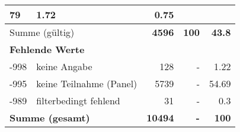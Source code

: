 \begin{longtable}{lXrrr}
       \num{79} &
       \num[round-mode=places,round-precision=2]{1,72} &
         \num[round-mode=places,round-precision=2]{0,75} \\
     \midrule
     \multicolumn{2}{l}{Summe (gültig)} &
       \textbf{\num{4596}} &
     \textbf{100} &
       \textbf{\num[round-mode=places,round-precision=2]{43,8}} \\
     \multicolumn{5}{l}{\textbf{Fehlende Werte}}\\
       -998 &
       keine Angabe &
         \num{128} &
        - &
         \num[round-mode=places,round-precision=2]{1,22} \\
       -995 &
       keine Teilnahme (Panel) &
         \num{5739} &
        - &
         \num[round-mode=places,round-precision=2]{54,69} \\
       -989 &
       filterbedingt fehlend &
         \num{31} &
        - &
         \num[round-mode=places,round-precision=2]{0,3} \\
     \midrule
     \multicolumn{2}{l}{\textbf{Summe (gesamt)}} &
          \textbf{\num{10494}} &
        \textbf{-} &
        \textbf{100} \\
     \bottomrule
     \end{longtable}
     

